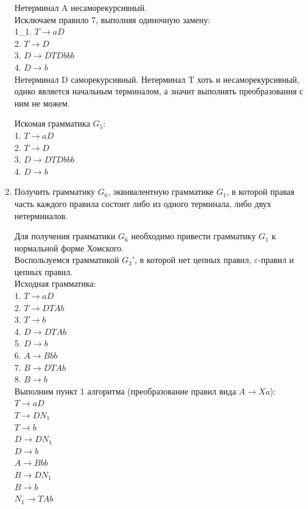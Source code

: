 \documentclass[a4paper,14pt]{extarticle}
\begin{document}
\begin{enumerate}[1.]
Нетерминал A несаморекурсивный.\\
Исключаем правило 7, выполняя одиночную замену:\\
1\_1. $T \rightarrow aD$\\
2. $T \rightarrow D$\\
3. $D \rightarrow DTDbbb$\\
4. $D \rightarrow b$\\

Нетерминал D саморекурсивный. Нетерминал T хоть и несаморекурсивный, 
однко является начальным терминалом, а значит выполнять преобразования 
с ним не можем.

Искомая грамматика $G_5$:\\
1. $T \rightarrow aD$\\
2. $T \rightarrow D$\\
3. $D \rightarrow DTDbbb$\\
4. $D \rightarrow b$\\

\item Получить грамматику $G_6$, эквивалентную грамматике $G_1$, в которой
правая часть каждого правила состоит либо из одного терминала, либо двух нетерминалов.

Для получения грамматики $G_6$ необходимо привести грамматику $G_1$ 
к нормальной форме Хомского.\\
Воспользуемся грамматикой $G_3'$, в которой нет цепных правил, $\varepsilon$-правил
и цепных правил.\\
Исходная грамматика:\\
1. $T \rightarrow aD$\\
2. $T \rightarrow DTAb$\\
3. $T \rightarrow b$\\
4. $D \rightarrow DTAb$\\
5. $D \rightarrow b$\\
6. $A \rightarrow Bbb$\\
7. $B \rightarrow DTAb$\\
8. $B \rightarrow b$\\

Выполним пункт 1 алгоритма (преобразование правил вида $A \rightarrow Xa$):\\
$T \rightarrow aD$\\
$T \rightarrow DN_1$\\
$T \rightarrow b$\\
$D \rightarrow DN_1$\\
$D \rightarrow b$\\
$A \rightarrow Bbb$\\
$B \rightarrow DN_1$\\
$B \rightarrow b$\\
$N_1 \rightarrow TAb$\\


\end{enumerate}
\end{document}
